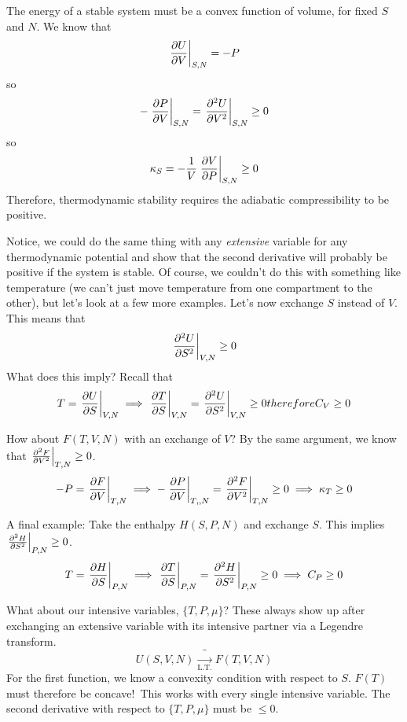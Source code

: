 \documentclass[a4paper,twoside,master.tex]{subfiles}
\begin{document}
The energy of a stable system must be a convex function of volume, for fixed $ S $ and $ N $. We know that
\begin{equation}
    \eval{\pdv{U}{V}}_{S,N} = -P
\end{equation}
so
\begin{equation}
    - \eval{\pdv{P}{V}}_{S,N} = \eval{\pdv[2]{U}{V}}_{S,N} \geq 0
\end{equation}
so
\begin{equation}
    \kappa_S = - \frac{1}{V} \eval{\pdv{V}{P}}_{S,N} \geq 0
\end{equation}
Therefore, thermodynamic stability requires the adiabatic compressibility to be positive.

Notice, we could do the same thing with any \textit{extensive} variable for any thermodynamic potential and show that the second derivative will probably be positive if the system is stable. Of course, we couldn't do this with something like temperature (we can't just move temperature from one compartment to the other), but let's look at a few more examples. Let's now exchange $ S $ instead of $ V $. This means that
\begin{equation}
    \eval{\pdv[2]{U}{S}}_{V,N} \geq 0
\end{equation}
What does this imply? Recall that
\begin{equation}
    T = \eval{\pdv{U}{S}}_{V,N} \implies \eval{\pdv{T}{S}}_{V,N} = \eval{\pdv[2]{U}{S}}_{V,N} \geq 0 therefore C_V \geq 0
\end{equation}

How about $ F(T,V,N) $ with an exchange of $ V $? By the same argument, we know that $ \eval{\pdv[2]{F}{V}}_{T,N} \geq 0 $.
\begin{equation}
    -P = \eval{\pdv{F}{V}}_{T,N} \implies - \eval{\pdv{P}{V}}_{T,,N} = \eval{\pdv[2]{F}{V}}_{T,N} \geq 0 \implies \kappa_T \geq 0 
\end{equation}

A final example: Take the enthalpy $ H(S,P,N) $ and exchange $ S $. This implies $ \eval{\pdv[2]{H}{S}}_{P,N} \geq 0 $.
\begin{equation}
    T = \eval{\pdv{H}{S}}_{P,N} \implies \eval{\pdv{T}{S}}_{P,N} = \eval{\pdv[2]{H}{S}}_{P,N} \geq 0 \implies C_P \geq 0
\end{equation}

What about our intensive variables, $ \{T, P, \mu\} $? These always show up after exchanging an extensive variable with its intensive partner via a Legendre transform.
\begin{equation}
    U(S,V,N) \overbrace{\to}_{\text{L.T.}} F(T,V,N)
\end{equation}
For the first function, we know a convexity condition with respect to $ S $. $ F(T) $ must therefore be concave!\ This works with every single intensive variable. The second derivative with respect to $ \{T, P, \mu\} $ must be $ \leq 0 $.
\end{document}
